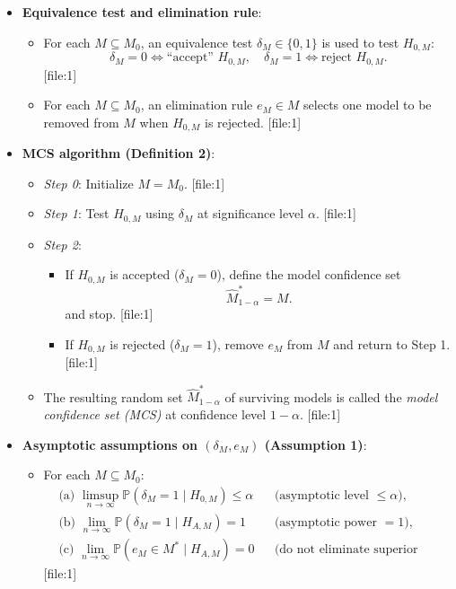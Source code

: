 \begin{itemize}

  \item \textbf{Equivalence test and elimination rule}:
    \begin{itemize}
      \item For each $M \subseteq M_0$, an equivalence test $\delta_M \in \{0,1\}$ is used to test $H_{0,M}$:
        \[
          \delta_M = 0 \iff \text{``accept'' } H_{0,M}, \quad
          \delta_M = 1 \iff \text{reject } H_{0,M}.
        \] [file:1]
      \item For each $M \subseteq M_0$, an elimination rule $e_M \in M$ selects one model to be removed from $M$ when $H_{0,M}$ is rejected. [file:1]
    \end{itemize}

  \item \textbf{MCS algorithm (Definition 2)}:
    \begin{itemize}
      \item \emph{Step 0}: Initialize $M = M_0$. [file:1]
      \item \emph{Step 1}: Test $H_{0,M}$ using $\delta_M$ at significance level $\alpha$. [file:1]
      \item \emph{Step 2}:
        \begin{itemize}
          \item If $H_{0,M}$ is accepted ($\delta_M=0$), define the model confidence set
            \[
              \widehat{M}^\ast_{1-\alpha} = M.
            \]
            and stop. [file:1]
          \item If $H_{0,M}$ is rejected ($\delta_M=1$), remove $e_M$ from $M$ and return to Step 1. [file:1]
        \end{itemize}
      \item The resulting random set $\widehat{M}^\ast_{1-\alpha}$ of surviving models is called the \emph{model confidence set (MCS)} at confidence level $1-\alpha$. [file:1]
    \end{itemize}

  \item \textbf{Asymptotic assumptions on $(\delta_M,e_M)$ (Assumption 1)}:
    \begin{itemize}
      \item For each $M \subseteq M_0$:
        \begin{align*}
          &\text{(a) } \limsup_{n\to\infty} \mathbb{P}(\delta_M = 1 \mid H_{0,M}) \le \alpha &&\text{(asymptotic level $\le\alpha$),} \\
          &\text{(b) } \lim_{n\to\infty} \mathbb{P}(\delta_M = 1 \mid H_{A,M}) = 1 &&\text{(asymptotic power $=1$),} \\
          &\text{(c) } \lim_{n\to\infty} \mathbb{P}(e_M \in M^\ast \mid H_{A,M}) = 0 &&\text{(do not eliminate superior models asymptotically).}
        \end{align*} [file:1]
    \end{itemize}


\end{itemize}
